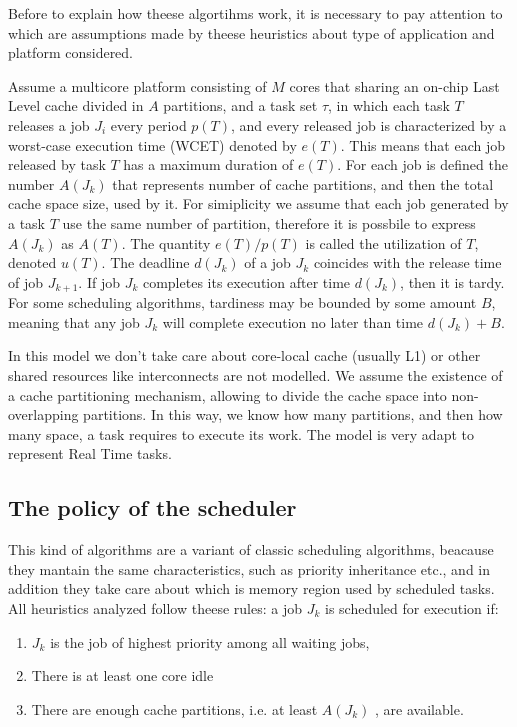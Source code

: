 Before to explain how theese algortihms work, it is necessary to pay attention to which are assumptions made by theese heuristics about type of application 
and platform considered.

Assume a multicore platform consisting of $M$ cores that sharing an on-chip Last Level cache divided in $A$ partitions, and a task set $\tau$,
in which each task $T$ releases a job $J_i$ every period $p(T)$, and every released job is characterized by a worst-case execution time (WCET) denoted
by $e(T)$. This means that each job released by task $T$ has a maximum duration of $e(T)$. For each job is defined the number $A(J_k)$ that represents 
number of cache partitions, and then the total cache space size, used by it. For simiplicity we assume that each job generated by a task $T$ use the same
number of partition, therefore it is possbile to express $A(J_k)$ as $A(T)$.
The quantity $e(T)/p(T)$ is called the utilization of $T$, denoted $u(T)$. The deadline $d(J_k)$ of a job $J_k$ coincides with the release time of job 
$J_{k+1}$. If job $J_k$ completes its execution after time $d(J_k)$, then it is tardy. For some scheduling algorithms, tardiness may be bounded by some 
amount $B$, meaning that any job $J_k$ will complete execution no later than time $d(J_k)+B$. 

In this model we don't take care about core-local cache (usually L1) or other shared resources like interconnects are not modelled.
We assume the existence of a cache partitioning mechanism, allowing to divide the cache space into non-overlapping partitions. 
In this way, we know how many partitions, and then how many space, a task requires to execute its work. The model is very adapt to represent Real Time tasks.

\newpage

\subsection{The policy of the scheduler}

This kind of algorithms are a variant of classic scheduling algorithms, beacause they mantain the same characteristics, such as priority inheritance etc.,
and in addition they take care about which is memory region used by scheduled tasks. All heuristics analyzed follow theese rules: a job $J_k$ is 
scheduled for execution if:

\begin{enumerate}
	\item $J_k$ is the job of highest priority among all waiting jobs,
	\item There is at least one core idle
	\item There are enough cache partitions, i.e. at least $A(J_k)$ , are available.
\end{enumerate}

